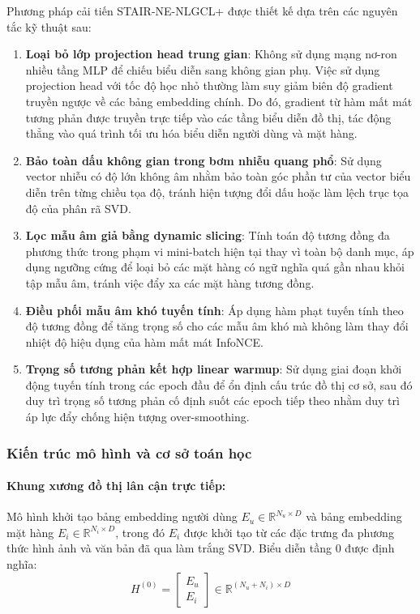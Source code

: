 Phương pháp cải tiến STAIR-NE-NLGCL+ được thiết kế dựa trên các nguyên tắc kỹ thuật sau:
\begin{enumerate}[leftmargin=*]
    \item \textbf{Loại bỏ lớp projection head trung gian}: Không sử dụng mạng nơ-ron nhiều tầng MLP để chiếu biểu diễn sang không gian phụ. Việc sử dụng projection head với tốc độ học nhỏ thường làm suy giảm biên độ gradient truyền ngược về các bảng embedding chính. Do đó, gradient từ hàm mất mát tương phản được truyền trực tiếp vào các tầng biểu diễn đồ thị, tác động thẳng vào quá trình tối ưu hóa biểu diễn người dùng và mặt hàng.
    \item \textbf{Bảo toàn dấu không gian trong bơm nhiễu quang phổ}: Sử dụng vector nhiễu có độ lớn không âm nhằm bảo toàn góc phần tư của vector biểu diễn trên từng chiều tọa độ, tránh hiện tượng đổi dấu hoặc làm lệch trục tọa độ của phân rã SVD.
    \item \textbf{Lọc mẫu âm giả bằng dynamic slicing}: Tính toán độ tương đồng đa phương thức trong phạm vi mini-batch hiện tại thay vì toàn bộ danh mục, áp dụng ngưỡng cứng để loại bỏ các mặt hàng có ngữ nghĩa quá gần nhau khỏi tập mẫu âm, tránh việc đẩy xa các mặt hàng tương đồng.
    \item \textbf{Điều phối mẫu âm khó tuyến tính}: Áp dụng hàm phạt tuyến tính theo độ tương đồng để tăng trọng số cho các mẫu âm khó mà không làm thay đổi nhiệt độ hiệu dụng của hàm mất mát InfoNCE.
    \item \textbf{Trọng số tương phản kết hợp linear warmup}: Sử dụng giai đoạn khởi động tuyến tính trong các epoch đầu để ổn định cấu trúc đồ thị cơ sở, sau đó duy trì trọng số tương phản cố định suốt các epoch tiếp theo nhằm duy trì áp lực đẩy chống hiện tượng over-smoothing.
\end{enumerate}

\subsubsection{Kiến trúc mô hình và cơ sở toán học}

\paragraph{Khung xương đồ thị lân cận trực tiếp:}
Mô hình khởi tạo bảng embedding người dùng $E_u \in \mathbb{R}^{N_u \times D}$ và bảng embedding mặt hàng $E_i \in \mathbb{R}^{N_i \times D}$, trong đó $E_i$ được khởi tạo từ các đặc trưng đa phương thức hình ảnh và văn bản đã qua làm trắng SVD. Biểu diễn tầng 0 được định nghĩa:
\begin{equation}
H^{(0)} = \begin{bmatrix} E_u \\ E_i \end{bmatrix} \in \mathbb{R}^{(N_u + N_i) \times D}
\end{equation}

